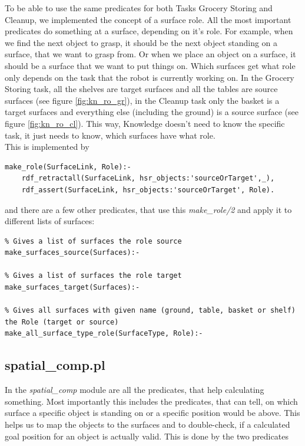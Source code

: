 \documentclass[main.tex]{subfiles}
\begin{document}
To be able to use the same predicates for both Tasks Grocery Storing and Cleanup, we implemented the concept of a surface role. All the most important predicates do something at a surface, depending on it's role. For example, when we find the next object to grasp, it should be the next object standing on a surface, that we want to grasp from. Or when we place an object on a surface, it should be a surface that we want to put things on. Which surfaces get what role only depends on the task that the robot is currently working on. In the Grocery Storing task, all the shelves are target surfaces and all the tables are source surfaces (see figure \ref{fig:kn_ro_gr}), in the Cleanup task only the basket is a target surfaces and everything else (including the ground) is a source surface (see figure \ref{fig:kn_ro_cl}). This way, Knowledge doesn't need to know the specific task, it just needs to know, which surfaces have what role.\\
This is implemented by 

\begin{lstlisting}
make_role(SurfaceLink, Role):-
    rdf_retractall(SurfaceLink, hsr_objects:'sourceOrTarget',_),
    rdf_assert(SurfaceLink, hsr_objects:'sourceOrTarget', Role).
\end{lstlisting}
and there are a few other predicates, that use this \textit{make\_role/2} and apply it to different lists of surfaces:
\begin{lstlisting}
% Gives a list of surfaces the role source
make_surfaces_source(Surfaces):-

% Gives a list of surfaces the role target
make_surfaces_target(Surfaces):-

% Gives all surfaces with given name (ground, table, basket or shelf) the Role (target or source)
make_all_surface_type_role(SurfaceType, Role):-
\end{lstlisting}


\subsection{spatial\_comp.pl}

In the \textit{spatial\_comp} module are all the predicates, that help calculating something. Most importantly this includes the predicates, that can tell, on which surface a specific object is standing on or a specific position would be above. This helps us to map the objects to the surfaces and to double-check, if a calculated goal position for an object is actually valid. This is done by the two predicates
\end{document}
